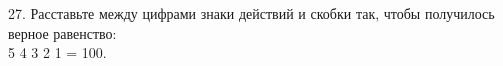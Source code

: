 27. Расставьте между цифрами знаки действий и скобки так, чтобы получилось верное равенство:\\ 5 4 3 2 1 = 100.\\
